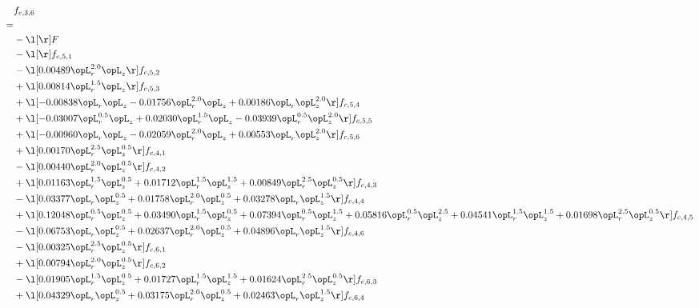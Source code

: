 \begin{alignat}{2} 
\label{eq:f_36_2} 
& f_{c,3,6} \nonumber \\ 
 = \\ 
& - \l[  \r] F \nonumber \\ 
& - \l[  \r] f_{c,5,1} \nonumber \\ 
& - \l[  0.00489 \opL_r^{2.0} \opL_z  \r] f_{c,5,2} \nonumber \\ 
& + \l[  0.00814 \opL_r^{1.5} \opL_z  \r] f_{c,5,3} \nonumber \\ 
& + \l[  -0.00838 \opL_r \opL_z   -0.01756 \opL_r^{2.0} \opL_z +  0.00186 \opL_r \opL_z^{2.0}  \r] f_{c,5,4} \nonumber \\ 
& + \l[  -0.03007 \opL_r^{0.5} \opL_z +  0.02030 \opL_r^{1.5} \opL_z   -0.03939 \opL_r^{0.5} \opL_z^{2.0}  \r] f_{c,5,5} \nonumber \\ 
& + \l[  -0.00960 \opL_r \opL_z   -0.02059 \opL_r^{2.0} \opL_z +  0.00553 \opL_r \opL_z^{2.0}  \r] f_{c,5,6} \nonumber \\ 
& + \l[  0.00170 \opL_r^{2.5} \opL_z^{0.5}  \r] f_{c,4,1} \nonumber \\ 
& - \l[  0.00440 \opL_r^{2.0} \opL_z^{0.5}  \r] f_{c,4,2} \nonumber \\ 
& + \l[  0.01163 \opL_r^{1.5} \opL_z^{0.5} +  0.01712 \opL_r^{1.5} \opL_z^{1.5} +  0.00849 \opL_r^{2.5} \opL_z^{0.5}  \r] f_{c,4,3} \nonumber \\ 
& - \l[  0.03377 \opL_r \opL_z^{0.5} +  0.01758 \opL_r^{2.0} \opL_z^{0.5} +  0.03278 \opL_r \opL_z^{1.5}  \r] f_{c,4,4} \nonumber \\ 
& + \l[  0.12048 \opL_r^{0.5} \opL_z^{0.5} +  0.03490 \opL_r^{1.5} \opL_z^{0.5} +  0.07394 \opL_r^{0.5} \opL_z^{1.5} +  0.05816 \opL_r^{0.5} \opL_z^{2.5} +  0.04541 \opL_r^{1.5} \opL_z^{1.5} +  0.01698 \opL_r^{2.5} \opL_z^{0.5}  \r] f_{c,4,5} \nonumber \\ 
& - \l[  0.06753 \opL_r \opL_z^{0.5} +  0.02637 \opL_r^{2.0} \opL_z^{0.5} +  0.04896 \opL_r \opL_z^{1.5}  \r] f_{c,4,6} \nonumber \\ 
& - \l[  0.00325 \opL_r^{2.5} \opL_z^{0.5}  \r] f_{c,6,1} \nonumber \\ 
& + \l[  0.00794 \opL_r^{2.0} \opL_z^{0.5}  \r] f_{c,6,2} \nonumber \\ 
& - \l[  0.01905 \opL_r^{1.5} \opL_z^{0.5} +  0.01727 \opL_r^{1.5} \opL_z^{1.5} +  0.01624 \opL_r^{2.5} \opL_z^{0.5}  \r] f_{c,6,3} \nonumber \\ 
& + \l[  0.04329 \opL_r \opL_z^{0.5} +  0.03175 \opL_r^{2.0} \opL_z^{0.5} +  0.02463 \opL_r \opL_z^{1.5}  \r] f_{c,6,4} \nonumber \\ 

\end{alignat}
